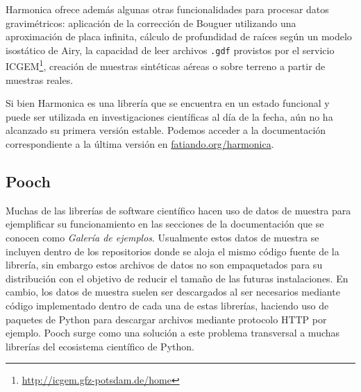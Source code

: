 Harmonica ofrece además algunas otras funcionalidades para procesar datos
gravimétricos: aplicación de la corrección de Bouguer utilizando una
aproximación de placa infinita, cálculo de profundidad de raíces según un
modelo isostático de Airy, la capacidad de leer archivos \texttt{.gdf}
provistos por el servicio
ICGEM\footnote{\url{http://icgem.gfz-potsdam.de/home}}, creación de muestras
sintéticas aéreas o sobre terreno a partir de muestras reales.

Si bien Harmonica es una librería que se encuentra en un estado funcional
y puede ser utilizada en investigaciones científicas al día de la fecha, aún no
ha alcanzado su primera versión estable.
Podemos acceder a la documentación correspondiente a la última versión en
\href{https://www.fatiando.org/harmonica}{fatiando.org/harmonica}.


\subsection{Pooch}

Muchas de las librerías de software científico hacen uso de datos de muestra
para ejemplificar su funcionamiento en las secciones de la documentación que se
conocen como \emph{Galería de ejemplos}.
Usualmente estos datos de muestra se incluyen dentro de los repositorios donde
se aloja el mismo código fuente de la librería, sin embargo estos archivos de
datos no son empaquetados para su distribución con el objetivo de reducir el
tamaño de las futuras instalaciones.
En cambio, los datos de muestra suelen ser descargados al ser necesarios
mediante código implementado dentro de cada una de estas librerías, haciendo
uso de paquetes de Python para descargar archivos mediante protocolo HTTP por
ejemplo.
Pooch surge como una solución a este problema transversal a muchas
librerías del ecosistema científico de Python.




